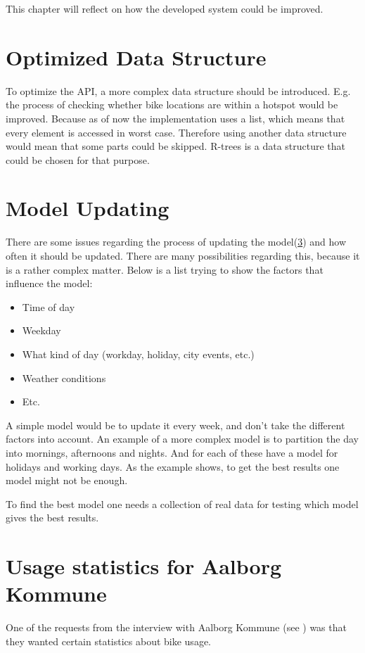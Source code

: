 This chapter will reflect on how the developed system could be improved.

\section{Optimized Data Structure}
To optimize the API, a more complex data structure should be introduced.
E.g. the process of checking whether bike locations are within a hotspot would be improved.
Because as of now the implementation uses a list, which means that every element is accessed in worst case.
Therefore using another data structure would mean that some parts could be skipped.
R-trees\cite[Section 25.3.5.3]{database_system_concepts} is a data structure that could be chosen for that purpose.

\section{Model Updating}\label{reflection:model_updating}
There are some issues regarding the process of updating the model(\cref{}) and how often it should be updated.
There are many possibilities regarding this, because it is a rather complex matter.
Below is a list trying to show the factors that influence the model:
\begin{itemize}
\item Time of day
\item Weekday
\item What kind of day (workday, holiday, city events, etc.)
\item Weather conditions
\item Etc.
\end{itemize}
A simple model would be to update it every week, and don't take the different factors into account.
An example of a more complex model is to partition the day into mornings, afternoons and nights.
And for each of these have a model for holidays and working days.
As the example shows, to get the best results one model might not be enough. 

To find the best model one needs a collection of real data for testing which model gives the best results.

\section{Usage statistics for Aalborg Kommune}
One of the requests from the interview with Aalborg Kommune (see ) was that they wanted certain statistics about bike usage.

